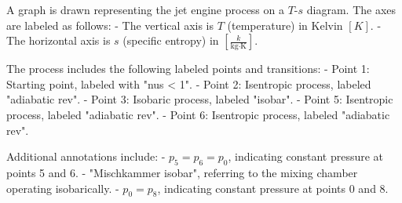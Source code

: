 A graph is drawn representing the jet engine process on a \( T \)-\( s \) diagram. The axes are labeled as follows:  
- The vertical axis is \( T \) (temperature) in Kelvin \([K]\).  
- The horizontal axis is \( s \) (specific entropy) in \([ \frac{k}{\text{kg} \cdot \text{K}} ]\).  

The process includes the following labeled points and transitions:  
- Point 1: Starting point, labeled with "nus < 1".  
- Point 2: Isentropic process, labeled "adiabatic rev".  
- Point 3: Isobaric process, labeled "isobar".  
- Point 5: Isentropic process, labeled "adiabatic rev".  
- Point 6: Isentropic process, labeled "adiabatic rev".  

Additional annotations include:  
- \( p_5 = p_6 = p_0 \), indicating constant pressure at points 5 and 6.  
- "Mischkammer isobar", referring to the mixing chamber operating isobarically.  
- \( p_0 = p_8 \), indicating constant pressure at points 0 and 8.